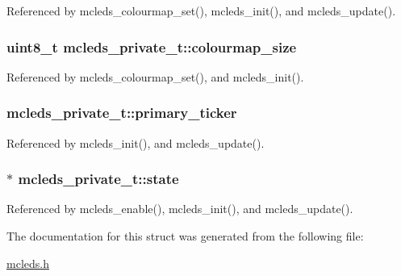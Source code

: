 Referenced by mcleds\_\-colourmap\_\-set(), mcleds\_\-init(), and mcleds\_\-update().\hypertarget{structmcleds__private__t_c050bb3fda786a88d006d96e68f63e62}{
\subsubsection{\setlength{\rightskip}{0pt plus 5cm}uint8\_\-t {\bf mcleds\_\-private\_\-t::colourmap\_\-size}}}
\label{structmcleds__private__t_c050bb3fda786a88d006d96e68f63e62}




Referenced by mcleds\_\-colourmap\_\-set(), and mcleds\_\-init().\hypertarget{structmcleds__private__t_a28c0e1e2655725ec18a07b5e736a06c}{
\subsubsection{ {\bf mcleds\_\-private\_\-t::primary\_\-ticker}}}
\label{structmcleds__private__t_a28c0e1e2655725ec18a07b5e736a06c}




Referenced by mcleds\_\-init(), and mcleds\_\-update().\hypertarget{structmcleds__private__t_48ecdee91058bddbe8a7b7aef55e7f80}{
\subsubsection{$\ast$ {\bf mcleds\_\-private\_\-t::state}}}
\label{structmcleds__private__t_48ecdee91058bddbe8a7b7aef55e7f80}




Referenced by mcleds\_\-enable(), mcleds\_\-init(), and mcleds\_\-update().

The documentation for this struct was generated from the following file:\begin{CompactItemize}
\item 
\hyperlink{mcleds_8h}{mcleds.h}\end{CompactItemize}
